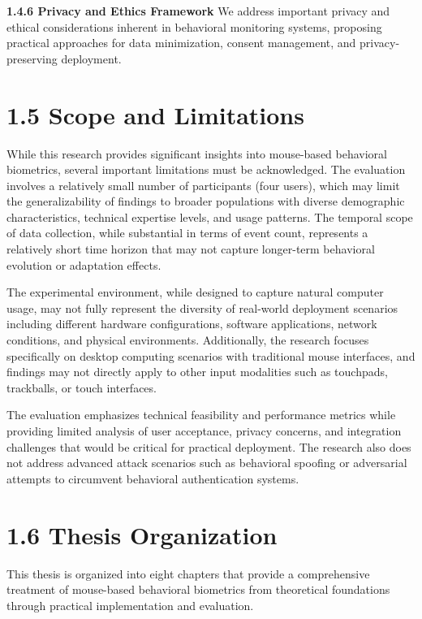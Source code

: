 \documentclass[
  12pt,
  a4paper,
]{report}
\begin{document}
\textbf{1.4.6 Privacy and Ethics Framework} We address important privacy
and ethical considerations inherent in behavioral monitoring systems,
proposing practical approaches for data minimization, consent
management, and privacy-preserving deployment.

\section{1.5 Scope and Limitations}\label{scope-and-limitations}

While this research provides significant insights into mouse-based
behavioral biometrics, several important limitations must be
acknowledged. The evaluation involves a relatively small number of
participants (four users), which may limit the generalizability of
findings to broader populations with diverse demographic
characteristics, technical expertise levels, and usage patterns. The
temporal scope of data collection, while substantial in terms of event
count, represents a relatively short time horizon that may not capture
longer-term behavioral evolution or adaptation effects.

The experimental environment, while designed to capture natural computer
usage, may not fully represent the diversity of real-world deployment
scenarios including different hardware configurations, software
applications, network conditions, and physical environments.
Additionally, the research focuses specifically on desktop computing
scenarios with traditional mouse interfaces, and findings may not
directly apply to other input modalities such as touchpads, trackballs,
or touch interfaces.

The evaluation emphasizes technical feasibility and performance metrics
while providing limited analysis of user acceptance, privacy concerns,
and integration challenges that would be critical for practical
deployment. The research also does not address advanced attack scenarios
such as behavioral spoofing or adversarial attempts to circumvent
behavioral authentication systems.

\section{1.6 Thesis Organization}\label{thesis-organization}

This thesis is organized into eight chapters that provide a
comprehensive treatment of mouse-based behavioral biometrics from
theoretical foundations through practical implementation and evaluation.
\end{document}
